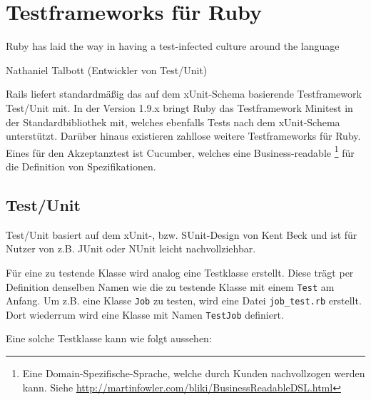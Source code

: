 
\section{Testframeworks für Ruby}
\epigraph{Ruby has laid the way in having a test-infected culture around the language}{Nathaniel Talbott (Entwickler von Test/Unit)}

Rails liefert standardmäßig das auf dem xUnit-Schema basierende Testframework Test/Unit mit. In der Version 1.9.x bringt Ruby das Testframework Minitest in der Standardbibliothek mit, welches ebenfalls Tests nach dem xUnit-Schema unterstützt. Darüber hinaus existieren zahllose weitere Testframeworks für Ruby. Eines für den Akzeptanztest ist Cucumber, welches eine Business-readable \footnote{Eine Domain-Spezifische-Sprache, welche durch Kunden nachvollzogen werden kann. Siehe \url{http://martinfowler.com/bliki/BusinessReadableDSL.html}} für die Definition von Spezifikationen.
\subsection{Test/Unit}
Test/Unit basiert auf dem xUnit-, bzw. SUnit-Design von Kent Beck und ist für Nutzer von z.B. JUnit oder NUnit leicht nachvollziehbar.

Für eine zu testende Klasse wird analog eine Testklasse erstellt. Diese trägt per Definition denselben Namen wie die zu testende Klasse mit einem \texttt{Test} am Anfang. Um z.B. eine Klasse \texttt{Job} zu testen, wird eine Datei \texttt{job\_test.rb}  erstellt. Dort wiederrum wird eine Klasse mit Namen \texttt{TestJob} definiert.


Eine solche Testklasse kann wie folgt aussehen:
\begin{ruby}[label=Testen mit Test/Unit]
 

   
   
      

   

   
       
     

       
\end{ruby}

